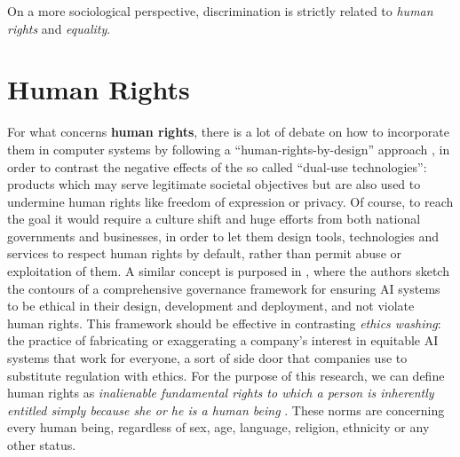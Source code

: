 On a more sociological perspective, discrimination is strictly related to \textit{human rights} and \textit{equality}.


\section{Human Rights}
For what concerns \textbf{human rights}, there is a lot of debate on how to incorporate them in computer systems by following a ``human-rights-by-design'' approach \cite{penney2018advancing}, in order to contrast the negative effects of the so called ``dual-use technologies'': products which may serve legitimate societal objectives but are also used to undermine human rights like freedom of expression or privacy. Of course, to reach the goal it would require a culture shift and huge efforts from both national governments and businesses, in order to let them design tools, technologies and services to respect human rights by default, rather than permit abuse or exploitation of them.
A similar concept is purposed in \cite{yeung2020ai}, where the authors sketch the contours of a comprehensive governance framework for ensuring AI systems to be ethical in their design, development and deployment, and not violate human rights. This framework should be effective in contrasting \textit{ethics washing}: the practice of fabricating or exaggerating a company's interest in equitable AI systems that work for everyone, a sort of side door that companies use to substitute regulation with ethics.
For the purpose of this research, we can define human rights as \emph{inalienable fundamental rights to which a person is inherently entitled simply because she or he is a human being} \cite[p.3]{sepuldeva2010human}. These norms are concerning every human being, regardless of sex, age, language, religion, ethnicity or any other status.


